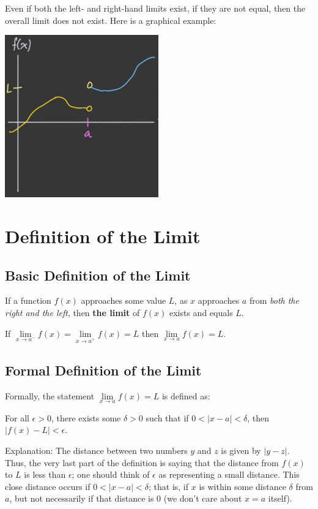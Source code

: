 \documentclass{article}
\begin{document}
Even if both the left- and right-hand limits exist, if they are not equal, then the overall limit
does not exist. Here is a graphical example:
\begin{center}\includegraphics[scale = 0.5]{Images/OverallLimit3.png}\end{center}

\pagebreak
\section{Definition of the Limit}
\subsection{Basic Definition of the Limit}
If a function $f (x)$ approaches some value $L$, as $x$ approaches $a$ from
\textit{both the right and the left}, then \textbf{the limit} of $f (x)$ exists and equals $L$.

If $\underset{x \rightarrow{}a^{-}}{\lim}f (x) = \underset{x \rightarrow{}a^{+}}{\lim}f (x) = L$
then $\underset{x \rightarrow{}a}{\lim}f (x) = L$.

\subsection{Formal Definition of the Limit}
Formally, the statement $\underset{x \rightarrow{}a}{\lim}f (x) = L$ is defined as:

For all $\epsilon> 0$, there exists some $\delta> 0$ such that if $0 < |x-a| < \delta$,
then $|f (x)-L| < \epsilon$.

Explanation:
The distance between two numbers $y$ and $z$ is given by $|y-z|$. Thus, the very last part of the
definition is saying that the distance from $f (x)$ to $L$ is less than $\epsilon$; one should think
of $\epsilon$ as representing a small distance. This close distance occurs if $0 < |x-a| < \delta$;
that is, if $x$ is within some distance $\delta$ from $a$, but not necessarily if that distance is $0$
(we don't care about $x=a$ itself).
\end{document}
